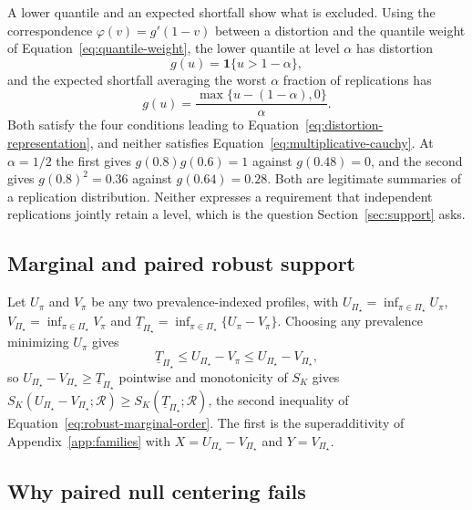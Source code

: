 \documentclass[11pt]{article}
\newcommand{\Regime}{\mathcal{R}}
\newcommand{\PSet}{\Pi_\star}
\theoremstyle{remark}
\begin{document}
A lower quantile and an expected shortfall show what is excluded. Using the correspondence $\varphi(v)=g'(1-v)$ between a distortion and the quantile weight of Equation~\eqref{eq:quantile-weight}, the lower quantile at level $\alpha$ has distortion
\[
g(u)=\mathbf{1}\{u>1-\alpha\},
\]
and the expected shortfall averaging the worst $\alpha$ fraction of replications has
\[
g(u)=\frac{\max\{u-(1-\alpha),0\}}{\alpha}.
\]
Both satisfy the four conditions leading to Equation~\eqref{eq:distortion-representation}, and neither satisfies Equation~\eqref{eq:multiplicative-cauchy}. At $\alpha=1/2$ the first gives $g(0.8)g(0.6)=1$ against $g(0.48)=0$, and the second gives $g(0.8)^2=0.36$ against $g(0.64)=0.28$. Both are legitimate summaries of a replication distribution. Neither expresses a requirement that independent replications jointly retain a level, which is the question Section~\ref{sec:support} asks.

\subsection{Marginal and paired robust support}

Let $U_\pi$ and $V_\pi$ be any two prevalence-indexed profiles, with $U_{\PSet}=\inf_{\pi\in\PSet}U_\pi$, $V_{\PSet}=\inf_{\pi\in\PSet}V_\pi$ and $\underline{T}_{\PSet}=\inf_{\pi\in\PSet}\{U_\pi-V_\pi\}$. Choosing any prevalence minimizing $U_\pi$ gives
\[
\underline{T}_{\PSet}
\leq
U_{\PSet}-V_\pi
\leq
U_{\PSet}-V_{\PSet},
\]
so $U_{\PSet}-V_{\PSet}\geq\underline{T}_{\PSet}$ pointwise and monotonicity of $S_K$ gives $S_K(U_{\PSet}-V_{\PSet};\Regime)\geq S_K(\underline{T}_{\PSet};\Regime)$, the second inequality of Equation~\eqref{eq:robust-marginal-order}. The first is the superadditivity of Appendix~\ref{app:families} with $X=U_{\PSet}-V_{\PSet}$ and $Y=V_{\PSet}$.

\subsection{Why paired null centering fails}
\label{app:paired-null}
\end{document}
